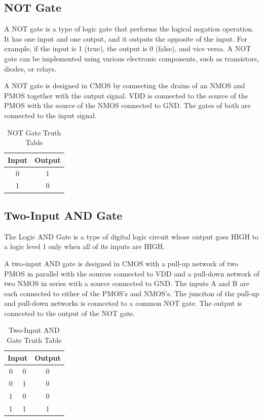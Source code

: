 \documentclass[conference]{IEEEtran}
\begin{document}
\subsection{NOT Gate}

A NOT gate is a type of logic gate that performs the logical negation operation. It has one input and one output, and it outputs the opposite of the input. For example, if the input is 1 (true), the output is 0 (false), and vice versa. A NOT gate can be implemented using various electronic components, such as transistors, diodes, or relays.

A NOT gate is designed in CMOS by connecting the drains of an NMOS and PMOS together with the output signal. VDD is connected to the source of the PMOS with the source of the NMOS connected to GND. The gates of both are connected to the input signal.

\begin{table}[htbp]
\caption{NOT Gate Truth Table}
\begin{center}
\begin{tabular}{|c|c|}
\hline
\textbf{Input}& \textbf{Output} \\
\hline
0 & 1 \\
\hline
1 & 0 \\
\hline
\end{tabular}
\end{center}
\end{table}

\subsection{Two-Input AND Gate}

The Logic AND Gate is a type of digital logic circuit whose output goes HIGH to a logic level 1 only when all of its inputs are HIGH.

A two-input AND gate is designed in CMOS with a pull-up network of two PMOS in parallel with the sources connected to VDD and a pull-down network of two NMOS in series with a source connected to GND. The inputs A and B are each connected to either of the PMOS's and NMOS's. The junciton of the pull-up and pull-down networks is connceted to a common NOT gate. The output is connceted to the output of the NOT gate.

\begin{table}[htbp]
\caption{Two-Input AND Gate Truth Table}
\begin{center}
\begin{tabular}{|c|c|c|}
\hline
\multicolumn{2}{|c|}{\textbf{Input}} & \textbf{Output} \\
\hline
0 & 0 & 0 \\
\hline
0 & 1 & 0 \\
\hline
1 & 0 & 0 \\
\hline
1 & 1 & 1 \\
\hline
\end{tabular}
\end{center}
\end{table}
\end{document}
